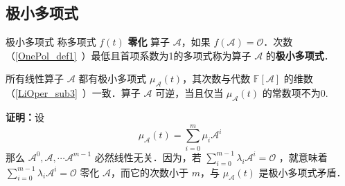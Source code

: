 \subsection{极小多项式}
\begin{definition}{极小多项式}
称多项式 $f(t)$ \textbf{零化} 算子 $\mathcal{A}$，如果 $f(\mathcal{A})=\mathcal O$．次数（\autoref{OnePol_def1}~）最低且首项系数为1的多项式称为算子 $\mathcal{A}$ 的\textbf{极小多项式}．
\end{definition}
\begin{theorem}{}
所有线性算子 $\mathcal{A}$ 都有极小多项式 $\mu_\mathcal{A}(t)$，其次数与代数 $\mathbb{F}[\mathcal{A}]$ 的维数（\autoref{LiOper_sub3}~）一致．算子 $\mathcal{A}$ 可逆，当且仅当 $\mu_\mathcal{A}(t)$ 的常数项不为0.
\end{theorem}
\textbf{证明：}设
\begin{equation}
\mu_\mathcal{A}(t)=\sum_{i=0}^m\mu_i\mathcal A^i
\end{equation}
那么 $\mathcal{A}^0,\mathcal{A},\cdots \mathcal{A}^{m-1}$ 必然线性无关．因为，若 $\sum_{i=0}^{m-1}\lambda_i\mathcal{A}^i=\mathcal{O}$ ，就意味着 $\sum_{i=0}^{m-1}\lambda_i\mathcal{A}^i=\mathcal{O}$ 零化 $\mathcal A$，而它的次数小于 $m$，与 $\mu_\mathcal{A}(t)$ 是极小多项式矛盾．